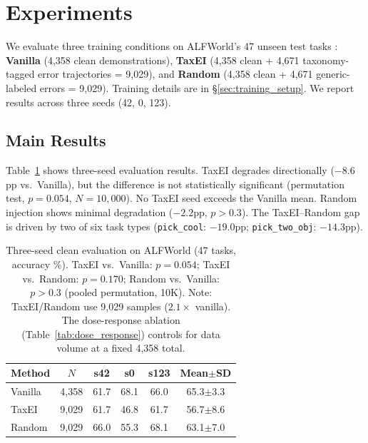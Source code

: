 \section{Experiments}
\label{sec:experiments}

We evaluate three training conditions on ALFWorld's 47 unseen test tasks \cite{shridhar2021alfworld}: \textbf{Vanilla} (4{,}358 clean demonstrations), \textbf{TaxEI} (4{,}358 clean + 4{,}671 taxonomy-tagged error trajectories = 9{,}029), and \textbf{Random} (4{,}358 clean + 4{,}671 generic-labeled errors = 9{,}029). Training details are in \S\ref{sec:training_setup}. We report results across three seeds (42, 0, 123).

\subsection{Main Results}
\label{sec:main_results}

Table~\ref{tab:main_results} shows three-seed evaluation results. TaxEI degrades directionally ($-8.6$pp vs.\ Vanilla), but the difference is not statistically significant (permutation test, $p{=}0.054$, $N{=}10{,}000$). No TaxEI seed exceeds the Vanilla mean. Random injection shows minimal degradation ($-2.2$pp, $p{>}0.3$). The TaxEI--Random gap is driven by two of six task types (\texttt{pick\_cool}: $-19.0$pp; \texttt{pick\_two\_obj}: $-14.3$pp).

\begin{table}[t]
\centering
\small
\begin{tabular}{lccccc}
\toprule
\textbf{Method} & \textbf{$N$} & \textbf{s42} & \textbf{s0} & \textbf{s123} & \textbf{Mean$\pm$SD} \\
\midrule
Vanilla & 4{,}358 & 61.7 & 68.1 & 66.0 & 65.3$\pm$3.3 \\
TaxEI   & 9{,}029 & 61.7 & 46.8 & 61.7 & 56.7$\pm$8.6 \\
Random  & 9{,}029 & 66.0 & 55.3 & 68.1 & 63.1$\pm$7.0 \\
\bottomrule
\end{tabular}
\caption{Three-seed clean evaluation on ALFWorld (47 tasks, accuracy \%). TaxEI vs.\ Vanilla: $p{=}0.054$; TaxEI vs.\ Random: $p{=}0.170$; Random vs.\ Vanilla: $p{>}0.3$ (pooled permutation, 10K). Note: TaxEI/Random use 9{,}029 samples ($2.1\times$ vanilla). The dose-response ablation (Table~\ref{tab:dose_response}) controls for data volume at a fixed 4{,}358 total.}
\label{tab:main_results}
\end{table}

